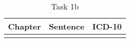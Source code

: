 \begin{table}[htbp] \footnotesize \center
\caption{Task 1b\label{tab:task1b}}
\begin{tabularx}{\textwidth}{c c X}
    \toprule
    Chapter & Sentence & ICD-10 \\
    \midrule
	\addlinespace
	\addlinespace
	\addlinespace
	\addlinespace
	\addlinespace
	\addlinespace
	\addlinespace
	\bottomrule
\end{tabularx}
\end{table}


